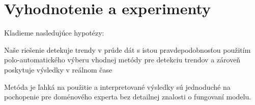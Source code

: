 \section{Vyhodnotenie a experimenty}
Kladieme nasledujúce hypotézy:
\begin{hypothesis}{Naše riešenie detekuje trendy v prúde dát s istou pravdepodobnosťou použitím polo-automatického výberu vhodnej metódy pre detekciu trendov a zároveň poskytuje výsledky v reálnom čase}
\end{hypothesis}
\begin{hypothesis}{Metóda je ľahká na použitie a interpretované výsledky sú jednoduché na pochopenie pre doménového experta bez detailnej znalosti o fungovaní modelu.}
\end{hypothesis}





